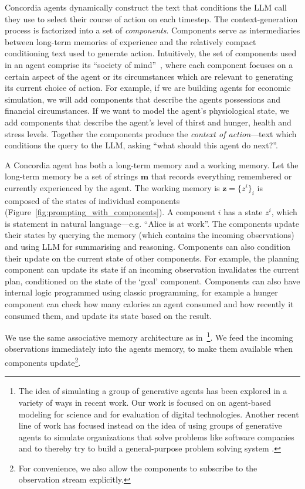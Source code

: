 \documentclass[11pt, a4paper, logo, twocolumn, internal, copyright, numbering]{googledeepmind}
\begin{document}
Concordia agents dynamically construct the text that conditions the LLM call they use to select their course of action on each timestep. The context-generation process is factorized into a set of \textit{components}. Components serve as intermediaries between long-term memories of experience and the relatively compact conditioning text used to generate action. 
Intuitively, the set of components used in an agent comprise its ``society of mind''~\citep{Minsky88}, where each component focuses on a certain aspect of the agent or its circumstances which are relevant to generating its current choice of action.
For example, if we are building agents for economic simulation, we will add components that describe the agents possessions and financial circumstances. 
If we want to model the agent's physiological state, we add components that describe the agent's level of thirst and hunger, health and stress levels. Together the components produce the \textit{context of action}---text which conditions the query to the LLM, asking ``what should this agent do next?''. 

A Concordia agent has both a long-term memory and a working memory. 
Let the long-term memory be a set of strings $\mathbf{m}$ that records everything remembered or currently experienced by the agent. 
The working memory is $\mathbf{z}=\{z^i\}_i$ is composed of the states of individual components (Figure~\ref{fig:prompting_with_components}). 
A component $i$ has a state $z^i$, which is statement in natural language---e.g. ``Alice is at work''. The components update their states by querying the memory (which contains the incoming observations) and using LLM for summarising and reasoning. Components can also condition their update on the current state of other components. For example, the planning component can update its state if an incoming observation invalidates the current plan, conditioned on the state of the `goal' component. Components can also have internal logic programmed using classic programming, for example a hunger component can check how many calories an agent consumed and how recently it consumed them, and update its state based on the result. 

We use the same associative memory architecture as in~\cite{park2023generative}\footnote{The idea of simulating a group of generative agents has been explored in a variety of ways in recent work. Our work is focused on on agent-based modeling for science and for evaluation of digital technologies. Another recent line of work has focused instead on the idea of using groups of generative agents to simulate organizations that solve problems like software companies and to thereby try to build a general-purpose problem solving system \citep{hong2023metagpt, li2023camel}.}. We feed the incoming observations immediately into the agents memory, to make them available when components update\footnote{For convenience, we also allow the components to subscribe to the observation stream explicitly.}.
\end{document}
